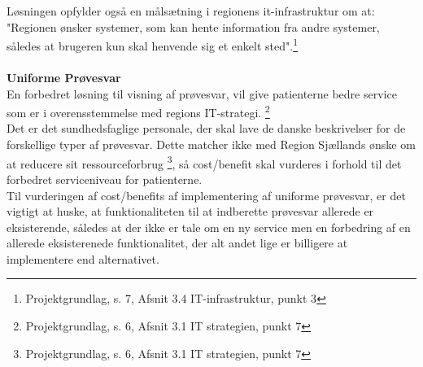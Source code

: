 Løsningen opfylder også en målsætning i regionens it-infrastruktur om at: "Regionen ønsker systemer, som kan hente information fra andre systemer, således at brugeren kun skal henvende sig et enkelt sted".\footnote{Projektgrundlag, s. 7, Afsnit 3.4 IT-infrastruktur, punkt 3}
\\\\
\textbf{Uniforme Prøvesvar}\\ %
En forbedret løsning til visning af prøvesvar, vil give patienterne bedre service som er i overensstemmelse med regions IT-strategi. \footnote{Projektgrundlag, s. 6, Afsnit 3.1 IT strategien, punkt 7}\\
Det er det sundhedsfaglige personale, der skal lave de danske beskrivelser for de forskellige typer af prøvesvar. Dette matcher ikke med Region Sjællands ønske om at reducere sit ressourceforbrug \footnote{Projektgrundlag, s. 6, Afsnit 3.1 IT strategien, punkt 7}, så cost/benefit skal vurderes i forhold til det forbedret serviceniveau for patienterne.\\
Til vurderingen af cost/benefits af implementering af uniforme prøvesvar, er det vigtigt at huske, at funktionaliteten til at indberette prøvesvar allerede er eksisterende, således at der ikke er tale om en ny service men en forbedring af en allerede eksisterenede funktionalitet, der alt andet lige er billigere at implementere end alternativet.
